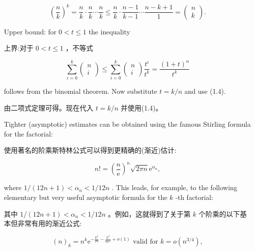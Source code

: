\documentclass[10pt]{article}
\begin{document}
\[
{\left( \frac{n}{k}\right) }^{k} = \frac{n}{k} \cdot  \frac{n}{k}\cdots \frac{n}{k} \leq  \frac{n}{k} \cdot  \frac{n - 1}{k - 1}\cdots \frac{n - k + 1}{1} = \left( \begin{array}{l} n \\  k \end{array}\right) .
\]

Upper bound: for \(0 < t \leq  1\) the inequality

\begin{tcolorbox}\relax
上界:对于 \(0 < t \leq  1\) ，不等式
\end{tcolorbox}

\[
\mathop{\sum }\limits_{{i = 0}}^{k}\left( \begin{array}{l} n \\  i \end{array}\right)  \leq  \mathop{\sum }\limits_{{i = 0}}^{k}\left( \begin{array}{l} n \\  i \end{array}\right) \frac{{t}^{i}}{{t}^{k}} = \frac{{\left( 1 + t\right) }^{n}}{{t}^{k}}
\]

follows from the binomial theorem. Now substitute \(t = k/n\) and use (1.4).

\begin{tcolorbox}\relax
由二项式定理可得。现在代入 \(t = k/n\) 并使用(1.4)。
\end{tcolorbox}

Tighter (asymptotic) estimates can be obtained using the famous Stirling formula for the factorial:

\begin{tcolorbox}\relax
使用著名的阶乘斯特林公式可以得到更精确的(渐近)估计:
\end{tcolorbox}

\[
n! = {\left( \frac{n}{\mathrm{e}}\right) }^{n}\sqrt{2\pi n}{\mathrm{e}}^{{\alpha }_{n}}, \tag{1.7}
\]

where \(1/\left( {{12n} + 1}\right)  < {\alpha }_{n} < 1/{12n}\) . This leads, for example, to the following elementary but very useful asymptotic formula for the \(k\) -th factorial:

\begin{tcolorbox}\relax
其中 \(1/\left( {{12n} + 1}\right)  < {\alpha }_{n} < 1/{12n}\) 。例如，这就得到了关于第 \(k\) 个阶乘的以下基本但非常有用的渐近公式:
\end{tcolorbox}

\[
{\left( n\right) }_{k} = {n}^{k}{\mathrm{e}}^{-\frac{{k}^{2}}{2n} - \frac{{k}^{3}}{6{n}^{2}} + o\left( 1\right) }\text{ valid for }k = o\left( {n}^{3/4}\right) , \tag{1.8}
\]
\end{document}
